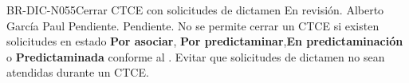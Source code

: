 \begin{BusinessRule}{BR-DIC-N055}{Cerrar CTCE con solicitudes de dictamen}
	{\bcCondition} %
	{\btEnabler}     %
	{\blInfluencing}     %
	\BRItem[Estado] En revisión.
	 Alberto García Paul
	 Pendiente.
	 Pendiente.
	\BRItem[Descripción] No se permite cerrar un CTCE si existen solicitudes en estado  \textbf{Por asociar}, \textbf{Por predictaminar},\textbf{En predictaminación} o \textbf{Predictaminada} conforme al .
	\BRItem[Motivación] Evitar que solicitudes de dictamen no sean atendidas durante un CTCE.
\end{BusinessRule}

